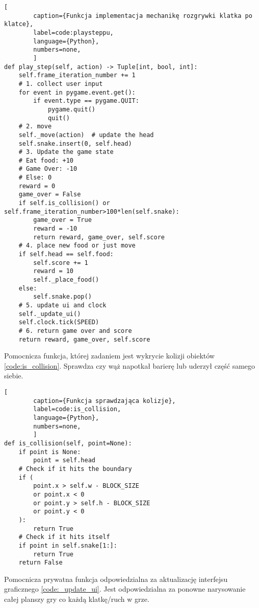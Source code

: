\begin{onepage}
    \begin{lstlisting}[
        caption={Funkcja implementacja mechanikę rozgrywki klatka po klatce},
        label=code:playsteppu,
        language={Python},
        numbers=none,
        ]
def play_step(self, action) -> Tuple[int, bool, int]:
    self.frame_iteration_number += 1
    # 1. collect user input
    for event in pygame.event.get():
        if event.type == pygame.QUIT:
            pygame.quit()
            quit()
    # 2. move
    self._move(action)  # update the head
    self.snake.insert(0, self.head)
    # 3. Update the game state
    # Eat food: +10
    # Game Over: -10
    # Else: 0
    reward = 0
    game_over = False
    if self.is_collision() or self.frame_iteration_number>100*len(self.snake):
        game_over = True
        reward = -10
        return reward, game_over, self.score
    # 4. place new food or just move
    if self.head == self.food:
        self.score += 1
        reward = 10
        self._place_food()
    else:
        self.snake.pop()
    # 5. update ui and clock
    self._update_ui()
    self.clock.tick(SPEED)
    # 6. return game over and score
    return reward, game_over, self.score
    \end{lstlisting}
\end{onepage}

\clearpage

Pomocnicza funkcja, której zadaniem jest wykrycie kolizji obiektów \ref{code:is_collision}. Sprawdza czy wąż napotkał barierę lub uderzył część samego siebie.


\begin{onepage}
    \begin{lstlisting}[
        caption={Funkcja sprawdzająca kolizje},
        label=code:is_collision,
        language={Python},
        numbers=none,
        ]
def is_collision(self, point=None):
    if point is None:
        point = self.head
    # Check if it hits the boundary
    if (
        point.x > self.w - BLOCK_SIZE
        or point.x < 0
        or point.y > self.h - BLOCK_SIZE
        or point.y < 0
    ):
        return True
    # Check if it hits itself
    if point in self.snake[1:]:
        return True
    return False
    \end{lstlisting}
\end{onepage}

Pomocnicza prywatna funkcja odpowiedzialna za aktualizację interfejsu graficznego \ref{code:_update_ui}. Jest odpowiedzialna za ponowne narysowanie całej planszy gry co każdą klatkę/ruch w grze.

